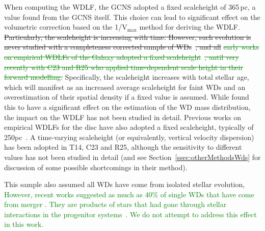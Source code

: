 \documentclass[fleqn,usenatbib]{mnras}
\begin{document}
When computing the WDLF, the GCNS adopted a fixed scaleheight of 365\,pc, a
value found from the GCNS itself. This choice can lead to significant effect
on the volumetric correction based on the 1/V$_{\mathrm{max}}$ method for
deriving the WDLF.
%
\sout{Particularly, the scaleheight is increasing with time.
However, such evolution is never studied with a completeness corrected sample
of WDs}~\citep{2006AJ....131..571H}\sout{, and all }\textcolor{green}{\sout{early works on empirical WDLFs 
of the Galaxy adopted a fixed scaleheight}~\citep{2006AJ....131..571H,
2011MNRAS.417...93R, 2019MNRAS.482..715L}\sout{, until very recently with C23 and
R25 who applied time-dependent scale height in their forward modelling.}}
\textcolor{nick}{
Specifically, the scaleheight increases with total stellar age, which will manifest
as an increased average scaleheight for faint WDs and an overestimation of their
spatial density if a fixed value is assumed. While \citet{2016MNRAS.461.2100T} found
this to have a significant effect on the estimation of the WD mass distribution,
the impact on the WDLF has not been studied in detail. Previous works on empirical
WDLFs for the disc have also adopted a fixed scaleheight, typically of 250pc~\citep{2006AJ....131..571H,
2011MNRAS.417...93R, 2019MNRAS.482..715L}.
A time-varying scaleheight (or equivalently, 
vertical velocity dispersion) has been adopted in T14, C23 and R25, although
the sensitivity to different values has not been studied in detail (and see 
Section~\ref{ssec:otherMethodsWds} for discussion of some possible shortcomings
in their method).
}

This sample also assumed all WDs have come from isolated stellar evolution,
\textcolor{green}{However, recent works suggested as much as 40\% of single
WDs that have come from merger \citep{2020A&A...636A..31T, 2020ApJ...898...84K}.
They are products
of stars that had gone through stellar interactions in the progenitor
systems~\citep[e.g.\ ][]{2013A&ARv..21...59I, 2023arXiv231117145H}. We do not
attempt to address this effect in this work.}
\end{document}
